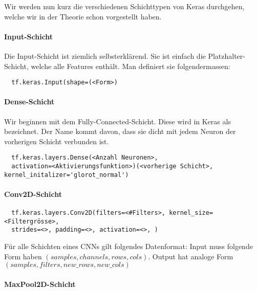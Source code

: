 Wir werden nun kurz die verschiedenen Schichttypen von Keras durchgehen, welche wir in
der Theorie schon vorgestellt haben.
\para{}


\cite{net:keras_init}

\paragraph{Input-Schicht}
Die Input-Schicht ist ziemlich selbsterklärend. Sie ist einfach die
Platzhalter-Schicht, welche alle Features enthält.
Man definiert sie folgendermassen:
\begin{verbatim}
  tf.keras.Input(shape=(<Form>)
\end{verbatim}

\paragraph{Dense-Schicht}
Wir beginnen mit dem Fully-Connected-Schicht. Diese wird in Keras als
 bezeichnet. Der Name kommt davon, dass sie dicht mit jedem Neuron
der vorherigen Schicht verbunden ist.
\begin{verbatim}
  tf.keras.layers.Dense(<Anzahl Neuronen>,
  activation=<Aktivierungsfunktion>)(<vorherige Schicht>, kernel_initalizer='glorot_normal')
\end{verbatim}

\paragraph{Conv2D-Schicht}

\begin{verbatim}
  tf.keras.layers.Conv2D(filters=<#Filters>, kernel_size=<Filtergrösse>,
  strides=<>, padding=<>, activation=<>, )
\end{verbatim}
Für alle Schichten eines CNNs gilt folgendes Datenformat:
Input muss folgende Form haben $(samples, channels, rows, cols)$. Output hat
analoge Form $(samples, filters, new\_rows, new\_cols)$

\paragraph{MaxPool2D-Schicht}

